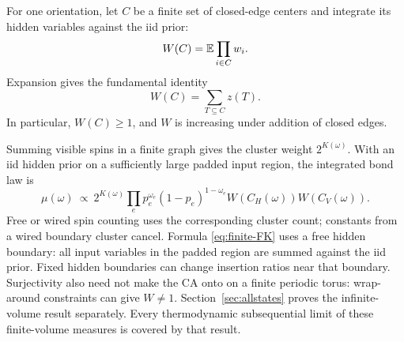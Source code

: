 For one orientation, let \(C\) be a finite set of closed-edge centers and integrate its hidden variables against the iid prior:
\begin{equation}
 W(C)=\mathbb E\prod_{i\in C}w_i.
\end{equation}
Expansion gives the fundamental identity
\begin{equation}
 \boxed{W(C)=\sum_{T\subseteq C}z(T).}
 \label{eq:W}
\end{equation}
In particular, \(W(C)\ge1\), and \(W\) is increasing under addition of closed edges.

Summing visible spins in a finite graph gives the cluster weight \(2^{K(\omega)}\). With an iid hidden prior on a sufficiently large padded input region, the integrated bond law is
\begin{equation}
 \mu(\omega)\ \propto\
 2^{K(\omega)}
 \prod_e p_e^{\omega_e}(1-p_e)^{1-\omega_e}
 W(C_H(\omega))W(C_V(\omega)).
 \label{eq:finite-FK}
\end{equation}
Free or wired spin counting uses the corresponding cluster count; constants from a wired boundary cluster cancel. Formula \eqref{eq:finite-FK} uses a free hidden boundary: all input variables in the padded region are summed against the iid prior. Fixed hidden boundaries can change insertion ratios near that boundary. Surjectivity also need not make the CA onto on a finite periodic torus: wrap-around constraints can give $W\ne1$. Section~\ref{sec:allstates} proves the infinite-volume result separately. Every thermodynamic subsequential limit of these finite-volume measures is covered by that result.
